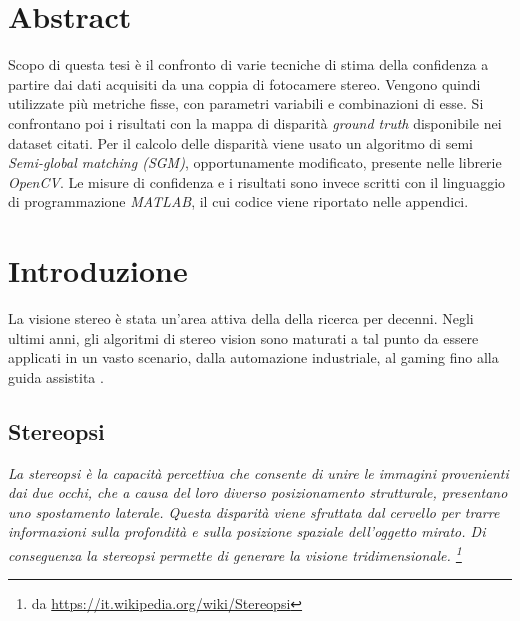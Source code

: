 \documentclass[12pt]{report}
\newcommand{\nullpage}{\newpage\null\thispagestyle{empty}}  %
\begin{document}
	\chapter*{Abstract}
	\label{sec:Abstract}
	\pagestyle{fancy}
	
	Scopo di questa tesi è il confronto di varie tecniche di stima della confidenza a partire dai dati acquisiti da una coppia di fotocamere stereo. Vengono quindi utilizzate più metriche fisse, con parametri variabili e combinazioni di esse. Si confrontano poi i risultati con la mappa di disparità \textit{ground truth} disponibile nei dataset citati. Per il calcolo delle disparità viene usato un algoritmo di semi \textit{Semi-global matching (SGM)}, opportunamente modificato, presente nelle librerie \textit{OpenCV}. Le misure di confidenza e i risultati sono invece scritti con il linguaggio di programmazione \textit{MATLAB}, il cui codice viene riportato nelle appendici.
	

	\nullpage						%
	\tableofcontents				%
	\nullpage						%

	\renewcommand{\thepage}{\arabic{page}} %
	\setcounter{page}{1}                   %


	\chapter{Introduzione}
	\label{sec:introduzione}
	\pagestyle{fancy}
	
		La visione stereo è stata un'area attiva della della ricerca per decenni. Negli ultimi anni, gli algoritmi di stereo vision sono maturati a tal punto da essere applicati in un vasto scenario, dalla automazione industriale, al gaming fino alla guida assistita \cite{mercedes}.
	
		\section{Stereopsi}
		\label{sec:Stereopsi}
			\textit{
			La stereopsi è la capacità percettiva che consente di unire le immagini provenienti dai due occhi, che a causa del loro diverso posizionamento strutturale, presentano uno spostamento laterale. Questa disparità viene sfruttata dal cervello per trarre informazioni sulla profondità e sulla posizione spaziale dell'oggetto mirato. Di conseguenza la stereopsi permette di generare la visione tridimensionale. \footnote{da \url{https://it.wikipedia.org/wiki/Stereopsi}} \newline}
			
\end{document}
